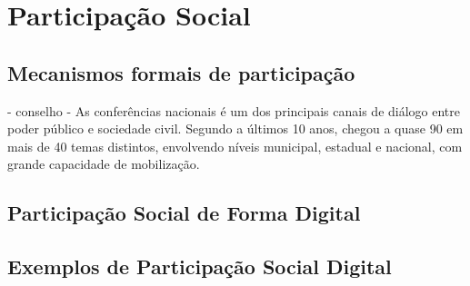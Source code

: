 \chapter{Participação Social}

\section{Mecanismos formais de participação}

- conselho - As conferências nacionais é um dos principais canais de diálogo entre poder público e sociedade civil. Segundo a  últimos 10 anos, chegou a quase 90 em mais de 40 temas distintos, envolvendo níveis municipal, estadual e nacional, com grande capacidade de mobilização. 


\section{Participação Social de Forma Digital}

\section{Exemplos de Participação Social Digital}

